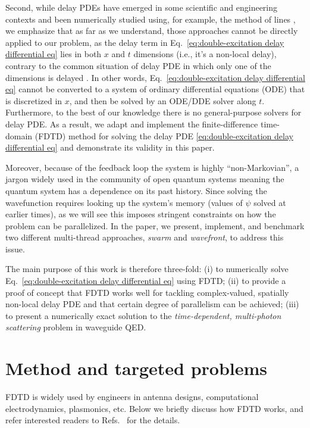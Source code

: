 \documentclass[final,1p,times]{elsarticle}
\begin{document}
Second, while delay PDEs have emerged in some scientific and engineering contexts and been numerically studied using, for example, the method of lines \cite{Zubik_Kowal_Sch08}, we emphasize that as far as we understand, those approaches cannot be directly applied to our problem, as the delay term in Eq.~\eqref{eq:double-excitation delay differential eq} lies in both $x$ and $t$ dimensions (i.e., it's a non-local delay), contrary to the common situation of delay PDE in which only one of the dimensions is delayed \cite{Zubik_Kowal_Sch08}. In other words, Eq.~\eqref{eq:double-excitation delay differential eq} cannot be converted to a system of ordinary differential equations (ODE) that is discretized in $x$, and then be solved by an ODE/DDE solver along $t$. Furthermore, to the best of our knowledge there is no general-purpose solvers for delay PDE. As a result, we adapt and implement the finite-difference time-domain (FDTD) method for solving the delay PDE \eqref{eq:double-excitation delay differential eq} and demonstrate its validity in this paper.  

Moreover, because of the feedback loop the system is highly ``non-Markovian'', a jargon widely used in the community of open quantum systems \cite{RivasRPP14,BreuerRMP16,deVegaRMP17} meaning the quantum system has a dependence on its past history. Since solving the wavefunction requires looking up the system's memory (values of $\psi$ solved at earlier times), as we will see this imposes stringent constraints on how the problem can be parallelized. In the paper, we present, implement, and benchmark two different multi-thread approaches, \emph{swarm} and \emph{wavefront}, to address this issue. 

The main purpose of this work is therefore three-fold: (i) to numerically solve Eq.~\eqref{eq:double-excitation delay differential eq} using FDTD; (ii) to provide a proof of concept that FDTD works well for tackling complex-valued, spatially non-local delay PDE and that certain degree of parallelism can be achieved; (iii)  to present a numerically exact solution to the \emph{time-dependent, multi-photon scattering} problem in waveguide QED.


\section{Method and targeted problems}
FDTD is widely used by engineers in antenna designs, computational electrodynamics, plasmonics, etc. 
Below we briefly discuss how FDTD works, and refer interested readers to Refs.~\cite{FDTDbook,FDTDnote} for the details.
\end{document}
